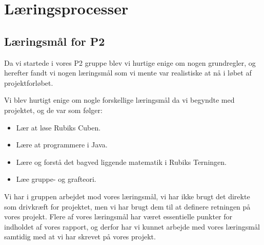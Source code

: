 \section{L\ae{}ringsprocesser}

\begin{comment}
Hvordan har i arbejdet med l\ae{}ringsm\aa{}l i gruppen?
Hvordan har i fulgt op p\aa{} de l\ae{}ringsm\aa{}l der blev defineret i gruppen? Har i n\aa{}et m\aa{}lene?
Hvordan l\ae{}rer du bedst, via individuelt arbejde -- gruppediskussion -- forel\ae{}sning etc.?
Hvordan har I brugt resultaterne af jeres individuelle l\ae{}ringsstilstest?
Hvilken l\ae{}ringsstrategi er efter jeres mening bedst i forbindelse med kurser? Hvorfor?
Hvordan hj\ae{}lper I hinanden med at l\o{}se opgaver i kurserne?
Hvad g\o{}r I hvis I ikke forst\aa{}r en forel\ae{}ser eller det der st\aa{}r i bogen?
Hvilken l\ae{}ringsstrategi er efter jeres mening bedst i forbindelse med projektarbejdet? Hvorfor
Hvordan stimulerer og fremmer jeres vejledere jeres l\ae{}reprocesser?
\end{comment}

\subsection{Læringsmål for P2}
Da vi startede i vores P2 gruppe blev vi hurtige enige om nogen grundregler, og herefter fandt vi nogen l\ae{}ringsm\aa{}l som vi mente var realistiske at n\aa{} i l\o{}bet af projektforl\o{}bet.

Vi blev hurtigt enige om nogle forskellige l\ae{}ringsm\aa{}l da vi begyndte med projektet, og de var som f\o{}lger:

\begin{itemize}
\item L\ae{}r at l\o{}se Rubiks Cuben.
\item L\ae{}re at programmere i Java.
\item L\ae{}re  og forst\aa{} det bagved liggende matematik i Rubiks Terningen. 
\item L\ae{}e gruppe- og grafteori.
\end{itemize}

Vi har i gruppen arbejdet mod vores l\ae{}ringsm\aa{}l, vi har ikke brugt det direkte som drivkr\ae{}ft for projektet, men vi har brugt dem til at definere retningen p\aa{} vores projekt.
Flere af vores l\ae{}ringsm\aa{}l har v\ae{}ret essentielle punkter for indholdet af vores rapport, og derfor har vi kunnet arbejde med vores l\ae{}ringsm\aa{}l samtidig med at vi har skrevet p\aa{} vores projekt.

